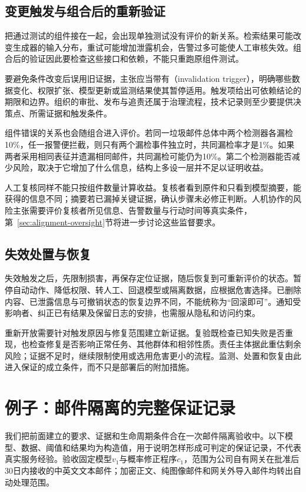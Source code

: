 \subsection{变更触发与组合后的重新验证}

把通过测试的组件接在一起，会出现单独测试没有评价的新关系。检索结果可能改变生成器的输入分布，重试可能增加泄露机会，告警过多可能使人工审核失效。组合后的验证因此要检查这些接口和依赖，不能只重跑原组件测试。

要避免条件改变后误用旧证据，主张应当带有（invalidation trigger），明确哪些数据变化、权限扩张、模型更新或监测结果使其暂停适用。触发项给出可依赖结论的期限和边界。组织的审批、发布与追责还属于治理流程，技术记录则至少要提供决策点、所需证据和触发条件。

组件错误的关系也会随组合进入评价。若同一垃圾邮件总体中两个检测器各漏检10\%，任一报警便拦截，则只有两个漏检事件独立时，共同漏检率才是1\%。如果两者采用相同表征并遗漏相同邮件，共同漏检可能仍为10\%。第二个检测器能否减少风险，取决于它增加了什么信息，结构上多设一层并不足以证明收益。

人工复核同样不能只按组件数量计算收益。复核者看到原件和只看到模型摘要，能获得的信息不同；摘要若已漏掉关键证据，确认步骤未必修正判断。人机协作的风险主张需要评价复核者所见信息、告警数量与行动时间等真实条件，第~\ref{sec:alignment-oversight}节将进一步讨论这些监督要求。

\subsection{失效处置与恢复}

失效触发之后，先限制损害，再保存定位证据，随后恢复到可重新评价的状态。暂停自动动作、降低权限、转人工、回退模型或隔离数据，应根据危害选择。已删除内容、已泄露信息与可撤销状态的恢复边界不同，不能统称为“回滚即可”。通知受影响者、纠正已有结果及保留日志的安排，也需服从隐私和访问约束。

重新开放需要针对触发原因与修复范围建立新证据。复验既检查已知失败是否重现，也检查修复是否影响正常任务、其他群体和相邻性质。责任主体据此重估剩余风险；证据不足时，继续限制使用或选用危害更小的流程。监测、处置和恢复由此进入保证的成立条件，而不只是部署后的附加措施。

\section{例子：邮件隔离的完整保证记录}
\label{sec:trust-mail-assurance}

我们把前面建立的要求、证据和生命周期条件合在一次邮件隔离验收中。以下模型、数据、阈值和结果均为构造值，用于说明怎样形成可判定的保证记录，不代表真实服务经验。验收固定模型$v_1$与概率修正程序$c_1$，范围为公司自有网关在批准后30日内接收的中英文文本邮件；加密正文、纯图像邮件和网关外导入邮件均转出自动处理范围。

